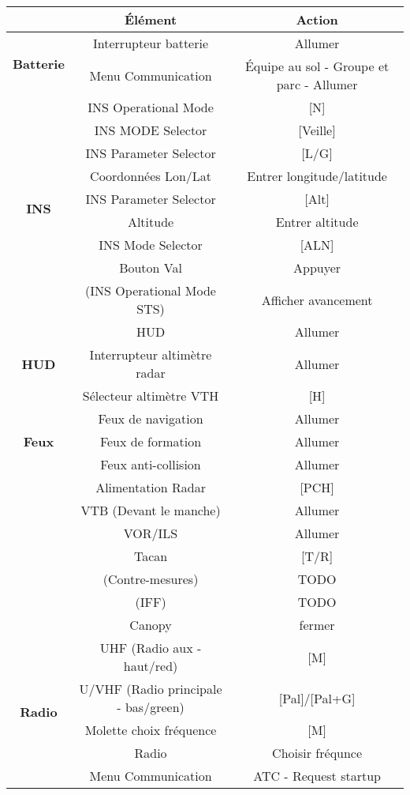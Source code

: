 \documentclass[12pt]{article}
\begin{document}
\begin{tabular}{|c|c|c|}
  \hline
  & \textbf{Élément} & \textbf{Action} \\
  \hline
  \multirow{2}{*}{\textbf{Batterie}}
  & Interrupteur batterie & Allumer \\
  & Menu Communication & Équipe au sol - Groupe et parc - Allumer \\
  \hline
  \multirow{9}{*}{\textbf{INS}}
  & INS Operational Mode & [N] \\
  & INS MODE Selector & [Veille] \\
  & INS Parameter Selector & [L/G] \\
  & Coordonnées Lon/Lat & Entrer longitude/latitude\\
  & INS Parameter Selector & [Alt] \\
  & Altitude & Entrer altitude\\
  & INS Mode Selector & [ALN] \\
  & Bouton Val & Appuyer \\
  & (INS Operational Mode STS) & Afficher avancement\\
  \hline
  \multirow{3}{*}{\textbf{HUD}}
  & HUD & Allumer \\
  & Interrupteur altimètre radar & Allumer \\
  & Sélecteur altimètre VTH & [H] \\
  \hline
  \multirow{3}{*}{\textbf{Feux}}
  & Feux de navigation & Allumer \\
  & Feux de formation & Allumer \\
  & Feux anti-collision & Allumer \\
  \hline
  & Alimentation Radar & [PCH] \\
  & VTB (Devant le manche) & Allumer\\
  & VOR/ILS & Allumer \\
  & Tacan & [T/R] \\
  & (Contre-mesures) & TODO \\
  & (IFF) & TODO \\
  & Canopy & fermer \\
  \hline
  \multirow{5}{*}{\textbf{Radio}}
  & UHF (Radio aux - haut/red) & [M] \\
  & U/VHF (Radio principale - bas/green) & [Pal]/[Pal+G] \\
  & Molette choix fréquence & [M] \\
  & Radio & Choisir fréqunce \\
  & Menu Communication & ATC - Request  startup \\

\end{tabular}
\end{document}
